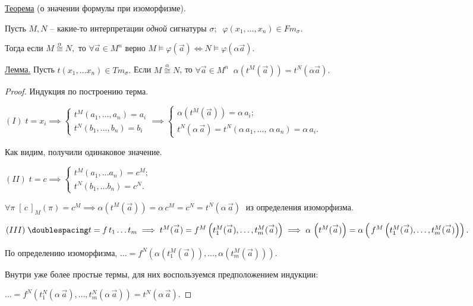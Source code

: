 \documentclass[a4paper, fleqn]{article}
\begin{document}
    \underline{Теорема} (о значении формулы при изоморфизме). 
    
    Пусть $M, N$ -- какие-то интерпретации \textit{одной} сигнатуры $\sigma; \; \; \varphi(x_1, \dots, x_n) \in Fm_\sigma.$
    
    Тогда если $M \overset{\alpha}{\cong} N,$ то $\forall \overset{\to}{a} \in M^n $ верно  $M \vDash \varphi (\overset{\to}{a}) \iff N \vDash \varphi (\alpha \overset{\to}{a}).$
    
    \underline{Лемма.} Пусть $t(x_1, \dots x_n) \in Tm_\sigma.$ Если $M \overset{\alpha}{\cong} N$, то $\forall \overset{\to}{a} \in M^n \; \; \alpha (t^M (\overset{\to}{a})) = t^N (\alpha \overset{\to}{a}).$
    
    \begin{proof} Индукция по построению терма.
    
    \onehalfspacing $(I) \;  t = x_i \implies \begin{cases} t^M (a_1, \dots,  a_n) = a_i \\ t^N (b_1, \dots,  b_n) = b_i  \end{cases} \implies
    \begin{cases}
    \alpha (t^M (\overset{\to}{a})) = \alpha  \, a_i; \\
    t^N (\alpha \, \overset{\to}{a}) = t^N(\alpha \, a_1, \dots, \, \alpha \, a_n) = \alpha  \, a_i.
    \end{cases}$
    
    Как видим, получили одинаковое значение.
    
    $(II) \; t = c \implies
    \begin{cases}
    t^M (a_1, \dots a_n) = c^M;\\
    t^N (b_1, \dots b _n) = c^N.
    \end{cases} $
    
    $ \forall \pi \; [\, c \, ]_M (\pi) = c^M  \implies
    \alpha (t^M(\overset{\to}{a})) = \alpha \, c^M = c^N = t^N (\alpha \, \overset{\to}{a})\;$ из определения изоморфизма.
    
    $(III) \;\doublespacing  t = f \, t_1 \dots  t_m \implies
    t^M(\overset{\to}{a}) = f^M \left(t_1^M(\overset{\to}{a})   , \dots, t_m^M(\overset{\to}{a}) \right) \implies
    \alpha \,\left( t^M(\overset{\to}{a})\right) = \alpha \left(\, f^M \left(t_1^M(\overset{\to}{a})   , \dots, t_m^M(\overset{\to}{a}) \right) \right).
     $ 
    
    По определению изоморфизма,  $\dots =  f^N \left( \alpha \left(t_1^M(\overset{\to}{a})\right)   , \dots,  \alpha \left(t_m^M(\overset{\to}{a}) \right) \right).$ 
    
    Внутри уже более простые термы, для них воспользуемся предположением индукции:
    
    $\dots =   f^N \left(  t_1^N(\alpha \, \overset{\to}{a})   , \dots, t_m^N( \alpha \, \overset{\to}{a})  \right) = t^N(\alpha \, \overset{\to}{a}).$
    
    \end{proof}
        
\end{document}
